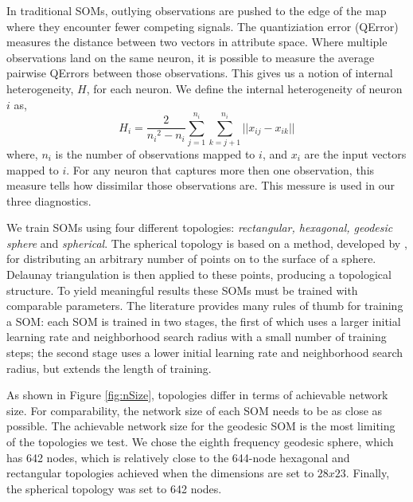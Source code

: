 In traditional SOMs, outlying observations are pushed to the edge of the map
where they encounter fewer competing signals.
The quantiziation error (QError) measures the distance between two vectors in attribute space. 
Where multiple observations land on the same neuron, it is possible to measure
the average pairwise QErrors between those observations.  This gives us a
notion of internal heterogeneity, \(H\), for each neuron.  We define the
internal heterogeneity of neuron \(i\) as,
 \begin{equation}
   {H_i} = \frac{2}{{n_i}^2-{n_i}}\sum_{j=1}^{n_i}\sum_{k=j+1}^{n_i} ||{x_{ij}}-{x_{ik}}||
 \label{eqno1}
 \end{equation}
where, \(n_i\) is the number of observations mapped to \(i\), and \(x_i\) are
the input vectors mapped to \(i\).  For any neuron that captures more then one
observation, this measure tells how dissimilar those observations are.  This
messure is used in our three diagnostics.

We train SOMs using four different topologies:
\emph{rectangular, hexagonal, geodesic sphere} and \emph{spherical}.  The spherical
topology is based on a method, developed by \cite{Rakhmanov94}, for
distributing an arbitrary number of points on to the surface of a sphere.
Delaunay triangulation is then applied to these points, producing a
topological structure.  To yield meaningful results these SOMs must be trained
with comparable parameters.  The literature provides many rules of thumb for
training a SOM: each SOM is trained in two stages, the first of which uses a larger
initial learning rate and neighborhood search radius with a small number of
training steps; the second stage uses a lower initial learning rate and
neighborhood search radius, but extends the length of training.

As shown in Figure \ref{fig:nSize}, topologies differ in terms of achievable
network size.  For comparability, the network size of each SOM needs to be as
close as possible.  The achievable network size for the geodesic SOM is the
most limiting of the topologies we test. We chose the eighth frequency
geodesic sphere, which has 642 nodes, which is relatively close to the
644-node hexagonal and rectangular topologies achieved when the dimensions are
set to \(28x23\). Finally, the spherical topology was set to 642 nodes.

